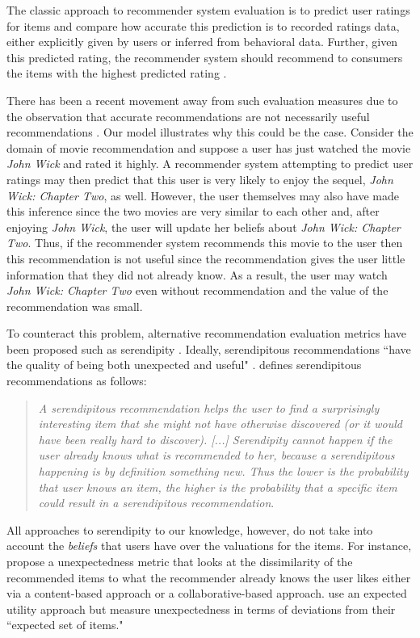 \documentclass[sigconf]{acmart}
\begin{document}
The classic approach to recommender system evaluation is to predict user ratings for items and compare how accurate this prediction is to recorded ratings data, either explicitly given by users or inferred from behavioral data. Further, given this predicted rating, the recommender system should recommend to consumers the items with the highest predicted rating \cite{adomavicius2005toward}.

There has been a recent movement away from such evaluation measures due to the observation that accurate recommendations are not necessarily useful recommendations \cite{mcnee2006being}. Our model illustrates why this could be the case. Consider the domain of movie recommendation and suppose a user has just watched the movie \textit{John Wick} and rated it highly. A recommender system attempting to predict user ratings may then predict that this user is very likely to enjoy the sequel, \textit{John Wick: Chapter Two}, as well. However, the user themselves may also have made this inference since the two movies are very similar to each other and, after enjoying \textit{John Wick}, the user will update her beliefs about \textit{John Wick: Chapter Two}. Thus, if the recommender system recommends this movie to the user then this recommendation is not useful since the recommendation gives the user little information that they did not already know. As a result, the user may watch \textit{John Wick: Chapter Two} even without recommendation and the value of the recommendation was small.

To counteract this problem, alternative recommendation evaluation metrics have been proposed such as serendipity
\cite{kotkov2016survey, kotkov2016challenges}. Ideally, serendipitous recommendations ``have the quality of being both unexpected and useful" \cite{maksai2015predicting}. \cite{iaquinta2010can} defines serendipitous recommendations as follows:
\begin{quote}
\textit{A serendipitous recommendation helps the
user to find a surprisingly interesting item that
she might not have otherwise discovered (or it
would have been really hard to discover). [...]
Serendipity cannot happen if the user already
knows what is recommended to her, because a
serendipitous happening is by definition something new. Thus the lower is the probability that user knows an item, the higher is the
probability that a specific item could result
in a serendipitous recommendation}.
\end{quote}

All approaches to serendipity to our knowledge, however, do not take into account the \textit{beliefs} that users have over the valuations for the items. For instance, \cite{vargas2011rank, kaminskas2014measuring} propose a unexpectedness metric that looks at the dissimilarity of the recommended items to what the recommender already knows the user likes either via a content-based approach or a collaborative-based approach. \cite{adamopoulos2015unexpectedness} use an expected utility approach but measure unexpectedness in terms of deviations from their ``expected set of items."
\end{document}
